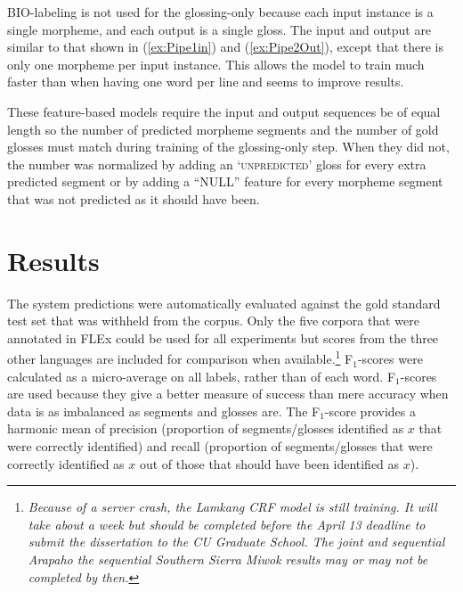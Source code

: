 BIO-labeling is not used for the glossing-only because each input instance is a single morpheme, and each output is a single gloss. The input and output are similar to that shown in (\ref{ex:Pipe1in}) and (\ref{ex:Pipe2Out}), except that there is only one morpheme per input instance. This allows the model to train much faster than when having one word per line and seems to improve results.

These feature-based models require the input and output sequences be of equal length so the number of predicted morpheme segments and the number of gold glosses must match during training of the glossing-only step. When they did not, the number was normalized by adding an `\textsc{unpredicted}' gloss for every extra predicted segment or by adding a ``NULL'' feature for every morpheme segment that was not predicted as it should have been. 


\section{Results}
\label{sec:sgresults}

The system predictions were automatically evaluated against the gold standard test set that was withheld from the corpus. Only the five corpora that were annotated in FLEx could be used for all experiments but scores from the three other languages are included for comparison when available.\footnote{\textit{Because of a server crash, the Lamkang CRF model is still training. It will take about a week but should be completed before the April 13 deadline to submit the dissertation to the CU Graduate School. The joint and sequential Arapaho the sequential Southern Sierra Miwok results may or may not be completed by then.}} F$_1$-scores were calculated as a micro-average on all labels, rather than of each word. F$_1$-scores are used because they give a better measure of success than mere accuracy when data is as imbalanced as segments and glosses are. The F$_1$-score provides a harmonic mean of precision (proportion of segments/glosses identified as $x$ that were correctly identified) and recall (proportion of segments/glosses that were correctly identified as $x$ out of those that should have been identified as $x$). 


